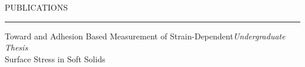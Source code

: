 \documentclass{resume} %
\renewenvironment{rSection}[1]{
	\sectionskip
	\textcolor{RoyalPurple}{\MakeUppercase{#1}}
	\sectionlineskip
	\hrule
	\begin{list}{}{
			\setlength{\leftmargin}{1.5em}
		}
		\item[]
	}{
	\end{list}
}
\begin{document}
%




\begin{rSection}{Publications} \itemsep -2pt
	\item {Toward and Adhesion Based Measurement of Strain-Dependent}\hfill {\em Undergraduate Thesis}\\ Surface Stress in Soft Solids
\end{rSection}
\end{document}

